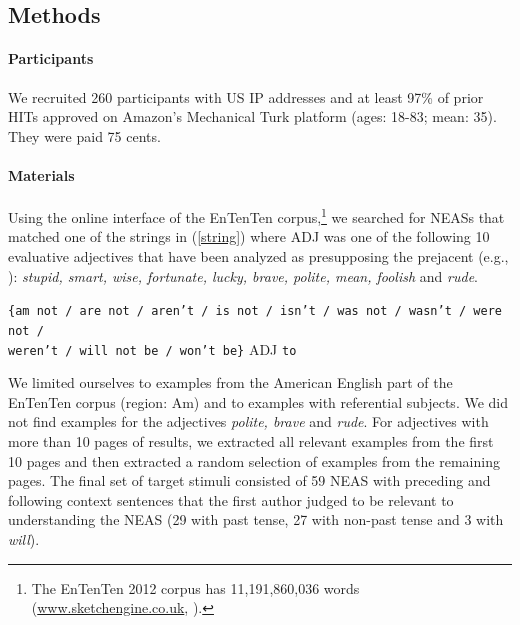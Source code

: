 \documentclass[11pt,fleqn]{article}
\newcommand{\6}{\mbox{$[\hspace*{-.6mm}[$}}
\newcommand{\9}{\mbox{$]\hspace*{-.6mm}]$}}
\begin{document}
\subsection{Methods}

\paragraph{Participants} We recruited 260 participants with US IP addresses and at least 97\% of prior HITs approved on Amazon's Mechanical Turk platform (ages: 18-83; mean: 35). They were paid 75 cents.  


\paragraph{Materials} Using the online interface of the EnTenTen corpus,\footnote{The EnTenTen 2012 corpus has 11,191,860,036 words
(\url{www.sketchengine.co.uk}, \citealt{ententen}).} we searched for NEASs that matched one of the strings in (\ref{string}) where ADJ was one of the following 10 evaluative adjectives that have been analyzed as presupposing the prejacent (e.g., \citealt{norrick78,karttunen-etal2014}): {\em stupid, smart, wise,
fortunate, lucky, brave, polite, mean, foolish} and {\em rude}.

\begin{exe}
\ex\label{string} {\tt \{am not / are not / aren't / is not / isn't / was not / wasn't / were not / \\ weren't / will not be / won't be\}} ADJ {\tt to}
\end{exe}
We limited ourselves to examples from the American English part of the EnTenTen corpus (region: Am) and to examples with referential subjects. We did not find examples for the adjectives {\em polite, brave} and {\em rude}. For adjectives with more than 10 pages of results, we extracted all relevant examples from the first 10 pages and then extracted a random selection of examples from the remaining pages. The final set of target stimuli consisted of 59 NEAS with preceding and following context sentences that the first author judged to be relevant to understanding the NEAS (29 with past tense, 27 with non-past tense and 3 with {\em will}).
\end{document}
